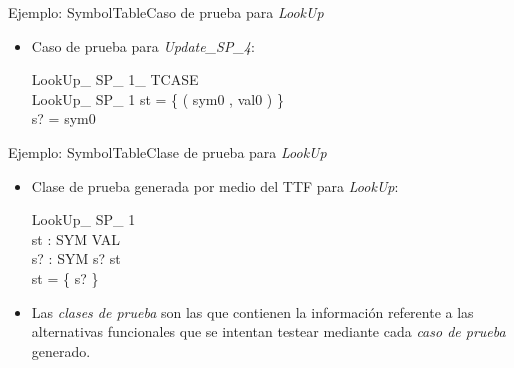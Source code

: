 \documentclass{beamer}
\begin{document}
\begin{frame}{Ejemplo: SymbolTable}{Caso de prueba para \emph{LookUp}}
  \begin{itemize}
    \vspace{-.5cm}
    \item{
      Caso de prueba para \emph{Update\_SP\_4}:\\
      \vspace{-.5cm}
      \begin{schema}{LookUp\_ SP\_ 1\_ TCASE}\\
        LookUp\_ SP\_ 1 
        \where
        st = \{ ( sym0 , val0 ) \} \\
        s? = sym0
      \end{schema}
    }
  \end{itemize}
\end{frame}
                                
\begin{frame}{Ejemplo: SymbolTable}{Clase de prueba para \emph{LookUp}}
  \begin{itemize}
    \item{
      Clase de prueba generada por medio del TTF para \emph{LookUp}:\\
      \vspace{-.5cm}
      \begin{schema}{LookUp\_ SP\_ 1}\\
        st : SYM \pfun VAL \\
        s? : SYM 
        \where
        s? \in \dom st \\
        \dom st = \{ s? \}
      \end{schema}
    }
                                                        
    \item Las \emph{clases de prueba} son las que contienen la información referente a las alternativas funcionales que se intentan testear mediante cada \emph{caso de prueba} generado.
                                                        
  \end{itemize}
\end{frame}
                                      
\end{document}
